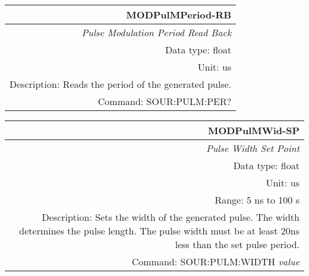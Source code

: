 \documentclass[openany]{article}
\begin{document}
		\begin{tabular}{N}
			\hline
			\bfseries MODPulMPeriod-RB \\ \hline
			\emph{Pulse Modulation Period Read Back} \\
			Data type: float \\
			Unit: us \\
			Description: Reads the period of the generated pulse. \\
			Command: SOUR:PULM:PER? \\

		\end{tabular}
%
		\begin{tabular}{N}
			\hline
			\bfseries MODPulMWid-SP \\ \hline
			\emph{Pulse Width Set Point} \\
			Data type: float \\
			Unit: us \\ 
			Range: 5 ns to 100 s \\
			Description: Sets the width of the generated pulse. The width determines the pulse length. The pulse width must be at least 20ns less than the set pulse period. \\
			Command: SOUR:PULM:WIDTH \emph{value} \\
			
		\end{tabular}
\end{document}
